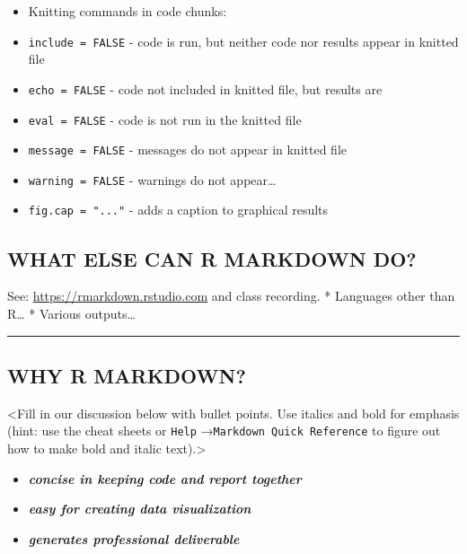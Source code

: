 \documentclass[
]{article}
\providecommand{\tightlist}{%
  \setlength{\itemsep}{0pt}\setlength{\parskip}{0pt}}
\begin{document}
\begin{itemize}
\tightlist
\item
  Knitting commands in code chunks:
\item
  \texttt{include\ =\ FALSE} - code is run, but neither code nor results
  appear in knitted file
\item
  \texttt{echo\ =\ FALSE} - code not included in knitted file, but
  results are
\item
  \texttt{eval\ =\ FALSE} - code is not run in the knitted file
\item
  \texttt{message\ =\ FALSE} - messages do not appear in knitted file
\item
  \texttt{warning\ =\ FALSE} - warnings do not appear\ldots{}
\item
  \texttt{fig.cap\ =\ "..."} - adds a caption to graphical results
\end{itemize}

\hypertarget{what-else-can-r-markdown-do}{%
\subsection{WHAT ELSE CAN R MARKDOWN
DO?}\label{what-else-can-r-markdown-do}}

See: \url{https://rmarkdown.rstudio.com} and class recording. *
Languages other than R\ldots{} * Various outputs\ldots{}

\begin{center}\rule{0.5\linewidth}{0.5pt}\end{center}

\hypertarget{why-r-markdown}{%
\subsection{WHY R MARKDOWN?}\label{why-r-markdown}}

\textless Fill in our discussion below with bullet points. Use italics
and bold for emphasis (hint: use the cheat sheets or \texttt{Help}
→\texttt{Markdown\ Quick\ Reference} to figure out how to make bold and
italic text).\textgreater{}

\begin{itemize}
\tightlist
\item
  \textbf{\emph{concise in keeping code and report together}}
\item
  \textbf{\emph{easy for creating data visualization}}
\item
  \textbf{\emph{generates professional deliverable}}
\end{itemize}
\end{document}
